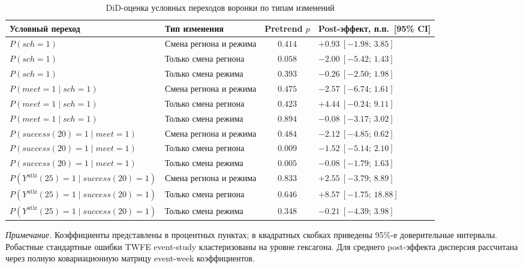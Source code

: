 \documentclass[14pt,a4paper]{extarticle}
\begin{document}
\begin{table}[H]
\centering
\caption{DiD-оценка условных переходов воронки по типам изменений}
\label{tab:conditional_funnel_did}
\footnotesize
\setlength{\tabcolsep}{2.5pt}
\renewcommand{\arraystretch}{1.12}
\begin{tabularx}{\textwidth}{@{}>{\raggedright\arraybackslash}X l c >{\centering\arraybackslash}X@{}}
\toprule
Условный переход & Тип изменения & Pretrend \(p\) & Post-эффект, п.п.\ [95\% CI] \\
\midrule
\(P(sch=1)\) & Смена региона и режима & \(0.414\) & \(+0.93\ [-1.98;\,3.85]\) \\
\(P(sch=1)\) & Только смена региона & \(0.058\) & \(-2.00\ [-5.42;\,1.43]\) \\
\(P(sch=1)\) & Только смена режима & \(0.393\) & \(-0.26\ [-2.50;\,1.98]\) \\
\midrule
\(P(meet=1 \mid sch=1)\) & Смена региона и режима & \(0.475\) & \(-2.57\ [-6.74;\,1.61]\) \\
\(P(meet=1 \mid sch=1)\) & Только смена региона & \(0.423\) & \(+4.44\ [-0.24;\,9.11]\) \\
\(P(meet=1 \mid sch=1)\) & Только смена режима & \(0.894\) & \(-0.08\ [-3.17;\,3.02]\) \\
\midrule
\(P(success(20)=1 \mid meet=1)\) & Смена региона и режима & \(0.484\) & \(-2.12\ [-4.85;\,0.62]\) \\
\(P(success(20)=1 \mid meet=1)\) & Только смена региона & \(0.009\) & \(-1.52\ [-5.14;\,2.10]\) \\
\(P(success(20)=1 \mid meet=1)\) & Только смена режима & \(0.005\) & \(-0.08\ [-1.79;\,1.63]\) \\
\midrule
\(P(Y^{\mathrm{utlz}}(25)=1 \mid success(20)=1)\) & Смена региона и режима & \(0.833\) & \(+2.55\ [-3.79;\,8.89]\) \\
\(P(Y^{\mathrm{utlz}}(25)=1 \mid success(20)=1)\) & Только смена региона & \(0.646\) & \(+8.57\ [-1.75;\,18.88]\) \\
\(P(Y^{\mathrm{utlz}}(25)=1 \mid success(20)=1)\) & Только смена режима & \(0.348\) & \(-0.21\ [-4.39;\,3.98]\) \\
\bottomrule
\end{tabularx}
\begin{minipage}{0.98\textwidth}
\scriptsize
\textit{Примечание.} Коэффициенты представлены в процентных пунктах; в
квадратных скобках приведены 95\%-е доверительные интервалы. Робастные
стандартные ошибки TWFE event-study кластеризованы на уровне гексагона. Для
среднего post-эффекта дисперсия рассчитана через полную ковариационную матрицу
event-week коэффициентов.
\end{minipage}
\end{table}
\end{document}
